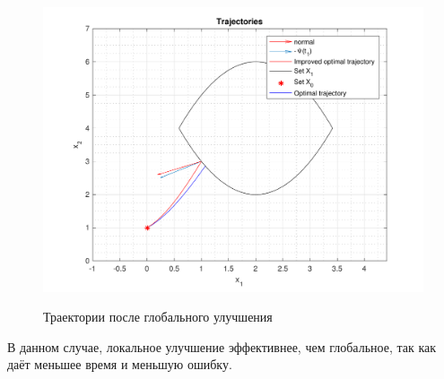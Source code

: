 \documentclass[11pt, oneside, final]{article}
\theoremstyle{break}
\numberwithin{equation}{section}
\theoremstyle{plain}
\theoremstyle{definition}
\begin{document}
    \begin{figure}[H]
        \centering
        \includegraphics[width=\linewidth]{s1fig3}
        \label{pic:s1:3}
        \caption{Траектории после глобального улучшения}
    \end{figure} 
    В данном случае, локальное улучшение эффективнее, чем глобальное, так как даёт меньшее время и меньшую ошибку.
    \pagebreak
\end{document}
